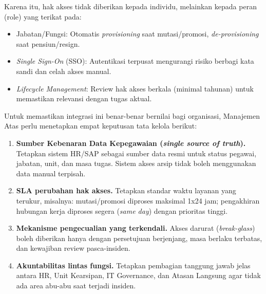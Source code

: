 \documentclass[12pt,a4paper]{report}
\begin{document}
Karena itu, hak akses tidak diberikan kepada individu, melainkan kepada peran (role) yang terikat pada:
\begin{itemize}[leftmargin=*]
    \item Jabatan/Fungsi: Otomatis \textit{provisioning} saat mutasi/promosi, \textit{de-provisioning} saat pensiun/resign.
    \item \textit{Single Sign-On} (SSO): Autentikasi terpusat mengurangi risiko berbagi kata sandi dan celah akses manual.
    \item \textit{Lifecycle Management}: Review hak akses berkala (minimal tahunan) untuk memastikan relevansi dengan tugas aktual.
\end{itemize}

Untuk memastikan integrasi ini benar-benar bernilai bagi organisasi, Manajemen Atas perlu menetapkan empat keputusan tata kelola berikut:
\begin{enumerate}[leftmargin=*]
  \item \textbf{Sumber Kebenaran Data Kepegawaian (\textit{single source of truth}).} Tetapkan sistem HR/SAP sebagai sumber data resmi untuk status pegawai, jabatan, unit, dan masa tugas. Sistem akses arsip tidak boleh menggunakan data manual terpisah.
  \item \textbf{SLA perubahan hak akses.} Tetapkan standar waktu layanan yang terukur, misalnya: mutasi/promosi diproses maksimal 1x24 jam; pengakhiran hubungan kerja diproses segera (\textit{same day}) dengan prioritas tinggi.
  \item \textbf{Mekanisme pengecualian yang terkendali.} Akses darurat (\textit{break-glass}) boleh diberikan hanya dengan persetujuan berjenjang, masa berlaku terbatas, dan kewajiban review pasca-insiden.
  \item \textbf{Akuntabilitas lintas fungsi.} Tetapkan pembagian tanggung jawab jelas antara HR, Unit Kearsipan, IT Governance, dan Atasan Langsung agar tidak ada area abu-abu saat terjadi insiden.
\end{enumerate}
\end{document}

